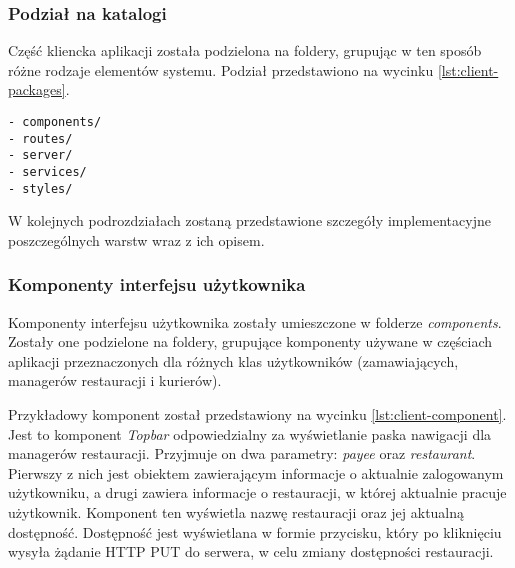 \subsubsection{Podział na katalogi}

Część kliencka aplikacji została podzielona na foldery, grupując w ten sposób różne rodzaje elementów systemu. Podział przedstawiono na wycinku \ref{lst:client-packages}.

\begin{lstlisting}[caption={Podział na foldery części klienckiej projektu},label={lst:client-packages},captionpos=b]
- components/
- routes/
- server/
- services/
- styles/
\end{lstlisting}

W kolejnych podrozdziałach zostaną przedstawione szczegóły implementacyjne poszczególnych warstw wraz z ich opisem.

\subsubsection{Komponenty interfejsu użytkownika}

Komponenty interfejsu użytkownika zostały umieszczone w folderze \textit{components}. Zostały one podzielone na foldery, grupujące komponenty używane w częściach aplikacji przeznaczonych dla różnych klas użytkowników (zamawiających, managerów restauracji i kurierów).

Przykładowy komponent został przedstawiony na wycinku \ref{lst:client-component}. Jest to komponent \textit{Topbar} odpowiedzialny za wyświetlanie paska nawigacji dla managerów restauracji. Przyjmuje on dwa parametry: \textit{payee} oraz \textit{restaurant}. Pierwszy z nich jest obiektem zawierającym informacje o aktualnie zalogowanym użytkowniku, a drugi zawiera informacje o restauracji, w której aktualnie pracuje użytkownik. Komponent ten wyświetla nazwę restauracji oraz jej aktualną dostępność. Dostępność jest wyświetlana w formie przycisku, który po kliknięciu wysyła żądanie HTTP PUT do serwera, w celu zmiany dostępności restauracji.

